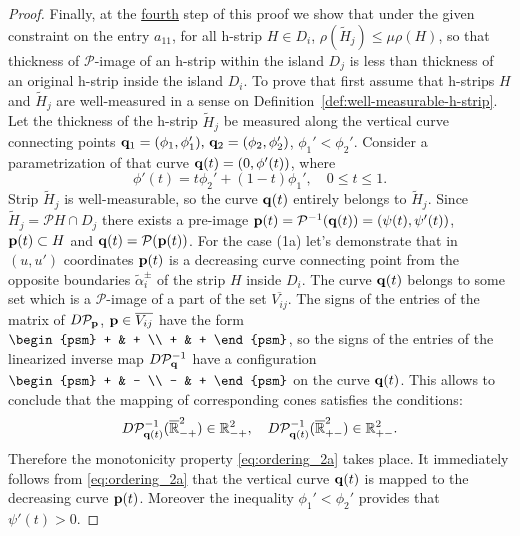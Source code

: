 \begin{proof}
	Finally, at the \underline{fourth} step of this proof we show that under the given constraint on the entry $a_{11}$, for all h-strip $H \in D_i$, $\rho (\widetilde{H}_j) \le \mu \rho(H)$, so that thickness of $\mathcal{P}$-image of an h-strip within the island $D_j$ is less than thickness of an original h-strip inside the island $D_i$.
	To prove that first assume that h-strips $H$ and $\widetilde{H}_j$ are well-measured in a sense on Definition~\ref{def:well-measurable-h-strip}.
	Let the thickness of the h-strip $\widetilde{H}_j$ be measured along the vertical curve connecting points $\vb{q}_1 = (\phi_1, \phi_1'), \, \vb{q}_2 = (\phi_2, \phi_2')$, $\phi_1' < \phi_2'$.
	Consider a parametrization of that curve $\vb{q}(t) = (0, \phi'(t))$, where
	\begin{equation}
		\phi'(t) = t \phi_2' + (1 - t) \phi_1', \quad 0 \le t \le 1.
	\end{equation}
	Strip $\widetilde{H}_j$ is well-measurable, so the curve $\vb{q}(t)$ entirely belongs to $\widetilde{H}_j$.
	Since $\widetilde{H}_j = \mathcal{P} H \cap D_j$ there exists a pre-image $\vb{p}(t) = \mathcal{P}^{-1} (\vb{q}(t)) = (\psi(t), \psi'(t))$, $\vb{p}(t) \subset H$ and $\vb{q}(t) = \mathcal{P} (\vb{p}(t))$.
	For the case (1a) let's demonstrate that in $(u, u')$ coordinates $\vb{p}(t)$ is a decreasing curve connecting point from the opposite boundaries $\widetilde{\alpha}_i^{\pm}$ of the strip $H$ inside $D_i$.
	The curve $\vb{q}(t)$ belongs to some set which is a $\mathcal{P}$-image of a part of the set $\overline{V_{ij}}$.
	The signs of the entries of the matrix of $D \mathcal{P}_{\vb{p}}$, $\vb{p} \in \overline{V_{ij}}$ have the form $\begin{psm} + & + \\ + & + \end{psm}$, so the signs of the entries of the linearized inverse map $D \mathcal{P}^{-1}_{\vb{q}}$ have a configuration $\begin{psm} + & - \\ - & + \end{psm}$ on the curve $\vb{q}(t)$.
	This allows to conclude that the mapping of corresponding cones satisfies the conditions:
	\begin{equation}
		D \mathcal{P}^{-1}_{\vb{q}(t)} (\overline{\mathbb{R}}_{-+}^2) \in \mathbb{R}_{-+}^2, \quad D \mathcal{P}^{-1}_{\vb{q}(t)} (\overline{\mathbb{R}}_{+-}^2) \in \mathbb{R}_{+-}^2.
	\label{eq:cones-backward}
	\end{equation}
	Therefore the monotonicity property \eqref{eq:ordering_2a} takes place.
	It immediately follows from \eqref{eq:ordering_2a} that the vertical curve $\vb{q}(t)$ is mapped to the decreasing curve $\vb{p}(t)$.
	Moreover the inequality $\phi_1' < \phi_2'$ provides that $\psi'(t) > 0$.
	

\end{proof}
